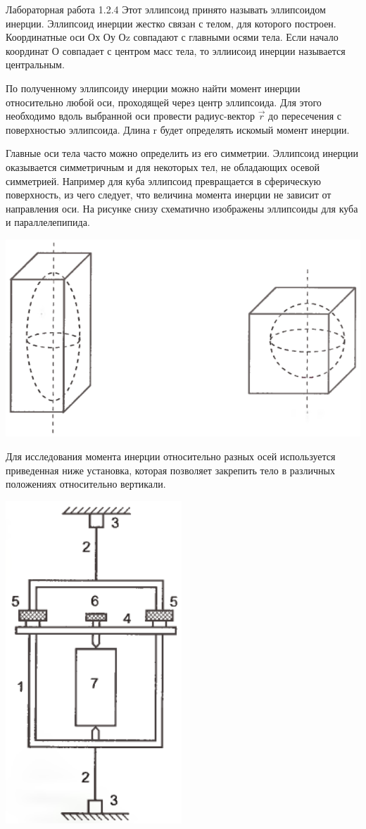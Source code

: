 \documentclass{astroedu-lab}
\begin{document}
\begin{problem}{\large Лабораторная работа 1.2.4}
Этот эллипсоид принято называть эллипсоидом инерции. Эллипсоид
инерции жестко связан с телом, для которого построен. Координатные оси Ох Оу Оz совпадают с главными осями тела. Если начало
координат О совпадает с центром масс тела, то эллиисоид инерции
называется центральным.

По полученному эллипсоиду инерции можно найти момент инерции относительно любой оси, проходящей через центр эллипсоида. Для этого необходимо вдоль выбранной оси провести радиус-вектор $\overrightarrow{r}$ до пересечения с поверхностью эллипсоида. Длина r будет определять искомый момент инерции.

Главные оси тела часто можно определить из его симметрии. Эллипсоид инерции оказывается симметричным и для некоторых тел, не обладающих осевой симметрией. Например для куба эллипсоид превращается в сферическую поверхность, из чего следует, что величина момента инерции не зависит от направления оси. На рисунке снизу схематично изображены эллипсоиды для куба и параллелепипида.

\begin{center}
\includegraphics[width=0.7\linewidth]{rect_cube.png}
\end{center}

Для исследования момента инерции относительно разных осей используется приведенная ниже установка, которая позволяет закрепить тело в различных положениях относительно вертикали.

\begin{center}
\includegraphics[width=0.25\linewidth]{device.png}
\end{center}


\end{problem}
\end{document}
